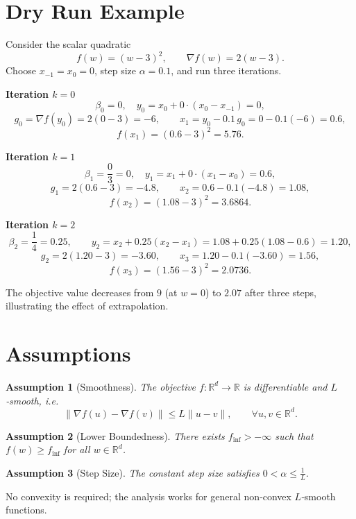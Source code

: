 \documentclass{article}
\newtheorem{assumption}{Assumption}
\newcommand{\R}{\mathbb{R}}
\begin{document}
\section*{Dry Run Example}
Consider the scalar quadratic
\[
f(w) = (w-3)^2 ,\qquad \nabla f(w)=2(w-3).
\]
Choose $x_{-1}=x_0=0$, step size $\alpha=0.1$, and run three iterations.

\medskip
\noindent\textbf{Iteration $k=0$}
\[
\beta_0 =0,\quad
y_0 = x_0 + 0\cdot(x_0-x_{-1}) =0,
\]
\[
g_0 = \nabla f(y_0)=2(0-3)=-6,\qquad
x_1 = y_0 -0.1\,g_0 = 0 -0.1(-6)=0.6,
\]
\[
f(x_1)= (0.6-3)^2 = 5.76.
\]

\noindent\textbf{Iteration $k=1$}
\[
\beta_1 =\frac{0}{3}=0,\quad
y_1 = x_1 +0\cdot(x_1-x_0)=0.6,
\]
\[
g_1 = 2(0.6-3) = -4.8,\qquad
x_2 = 0.6 -0.1(-4.8)=1.08,
\]
\[
f(x_2) = (1.08-3)^2 = 3.6864.
\]

\noindent\textbf{Iteration $k=2$}
\[
\beta_2 =\frac{1}{4}=0.25,\qquad
y_2 = x_2 +0.25(x_2-x_1)=1.08+0.25(1.08-0.6)=1.20,
\]
\[
g_2 = 2(1.20-3) = -3.60,\qquad
x_3 = 1.20 -0.1(-3.60)=1.56,
\]
\[
f(x_3) = (1.56-3)^2 = 2.0736.
\]

The objective value decreases from $9$ (at $w=0$) to $2.07$ after three steps,
illustrating the effect of extrapolation.

\section*{Assumptions}
\begin{assumption}[Smoothness]\label{as:smooth}
The objective $f:\R^d\to\R$ is differentiable and $L$‑smooth, i.e.
\[
\|\nabla f(u)-\nabla f(v)\|\le L\|u-v\|,\qquad\forall u,v\in\R^d .
\]
\end{assumption}
\begin{assumption}[Lower Boundedness]\label{as:lb}
There exists $f_{\inf}>-\infty$ such that $f(w)\ge f_{\inf}$ for all $w\in\R^d$.
\end{assumption}
\begin{assumption}[Step Size]\label{as:step}
The constant step size satisfies $0<\alpha\le \frac{1}{L}$.
\end{assumption}
No convexity is required; the analysis works for general non‑convex $L$‑smooth
functions.

\end{document}
